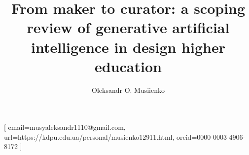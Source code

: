 \documentclass[ed]{acnsart}
\begin{document}
\title{From maker to curator: a scoping review of generative artificial intelligence in design higher education}

	\author{Oleksandr O. Musiienko}[
email={musyaleksandr1110@gmail.com},
url={https://kdpu.edu.ua/personal/musienko12911.html},
orcid={0000-0003-4906-8172}
] 

\address{Kryvyi Rih State Pedagogical University, 54 Universytetskyi Ave., Kryvyi Rih, 50086, Ukraine}




\end{document}
